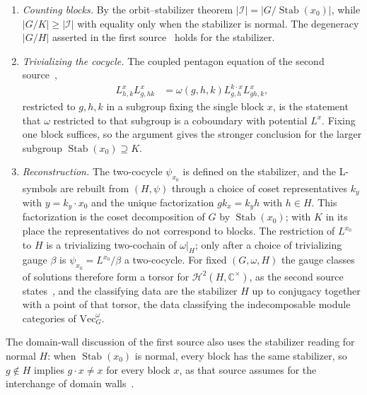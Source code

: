 \documentclass{article}
\begin{document}
\begin{enumerate}
    \item \emph{Counting blocks.} By the orbit--stabilizer theorem
          $|\mathcal I|=|G/\operatorname{Stab}(x_0)|$, while
          $|G/K|\geq|\mathcal I|$ with equality only when the stabilizer is
          normal. The degeneracy $|G/H|$ asserted in the first
          source~\cite{GarreRubioSchuch2024DomainWall} holds for the
          stabilizer.
    \item \emph{Trivializing the cocycle.} The coupled pentagon equation
          of the second source~\cite{GarreRubio2023MPOSym},
          \begin{align}
              L^x_{h,k}L^x_{g,hk} & =\omega(g,h,k)L^{k\cdot x}_{g,h}L^x_{gh,k},
              \label{eq:gs24_unbroken_subgroup_coupled_pentagon}
          \end{align}
          restricted to $g,h,k$ in a subgroup fixing the single block $x$,
          is the statement that $\omega$ restricted to that subgroup is a
          coboundary with potential $L^x$. Fixing one block suffices, so the
          argument gives the stronger conclusion for the larger subgroup
          $\operatorname{Stab}(x_0)\supseteq K$.
    \item \emph{Reconstruction.} The two-cocycle $\psi_{x_0}$ is defined on
          the stabilizer, and the L-symbols are rebuilt from $(H,\psi)$
          through a choice of coset representatives $k_y$ with
          $y=k_y\cdot x_0$ and the unique factorization $gk_x=k_yh$ with
          $h\in H$. This factorization is the coset decomposition of $G$ by
          $\operatorname{Stab}(x_0)$; with $K$ in its place the
          representatives do not correspond to blocks. The restriction of
          $L^{x_0}$ to $H$ is a trivializing two-cochain of $\omega|_H$; only
          after a choice of trivializing gauge $\beta$ is
          $\psi_{x_0}=L^{x_0}/\beta$ a two-cocycle. For fixed $(G,\omega,H)$
          the gauge classes of solutions therefore form a torsor for
          $\mathcal H^2(H,\mathbb C^\times)$, as the second source
          states~\cite{GarreRubio2023MPOSym}, and the classifying data are the stabilizer $H$ up to
          conjugacy together with a point of that torsor, the data
          classifying the indecomposable module categories of
          $\mathrm{Vec}_G^\omega$.
\end{enumerate}

The domain-wall discussion of the first source also uses the stabilizer
reading for normal $H$: when $\operatorname{Stab}(x_0)$ is normal, every
block has the same stabilizer, so $g\notin H$ implies $g\cdot x\neq x$ for
every block $x$, as that source assumes for the interchange of domain
walls~\cite{GarreRubioSchuch2024DomainWall}.
\end{document}
